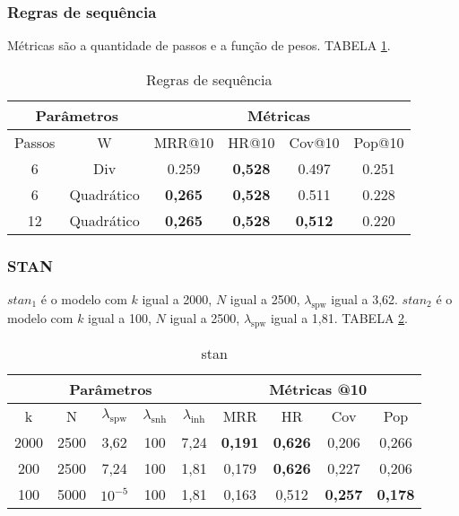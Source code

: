   \subsubsection{Regras de sequência}
Métricas são a quantidade de passos e a função de pesos. TABELA \ref{app:sr}.
\begin{table}[htbp]
    \centering
    \begin{tabular}{|c|c|c|c|c|c|}
        \hline
        \multicolumn{2}{|c|}{Parâmetros} & \multicolumn{4}{c|}{Métricas} \\
        \hline
        Passos & W & MRR@10 & HR@10 & Cov@10 & Pop@10 \\
        \hline
        6 & Div & 0.259 & \textbf{0,528} & 0.497 & 0.251 \\
        \hline
        6 & Quadrático & \textbf{0,265} & \textbf{0,528} & 0.511 & 0.228 \\
        \hline
        12 & Quadrático & \textbf{0,265} & \textbf{0,528} & \textbf{0,512} & 0.220 \\
        \hline
        \end{tabular}
    \caption{Regras de sequência}
    \label{app:sr}
\end{table}


\subsubsection{STAN}
$stan_1$ é o modelo com $k$ igual a 2000, $N$ igual a 2500,
$\lambda_{\text{spw}}$ igual a 3,62. $stan_2$ é o modelo com $k$ igual a 100,
$N$ igual a 2500, $\lambda_{\text{spw}}$ igual a 1,81. TABELA \ref{app:stan}.


\begin{table}[htbp]
    \centering
    \begin{tabular}{|c|c|c|c|c|c|c|c|c|}
      \hline
      \multicolumn{5}{|c|}{Parâmetros} & \multicolumn{4}{c|}{Métricas @10} \\
      \hline
      k & N & $\lambda_{\text{spw}}$ & $\lambda_{\text{snh}}$ & $\lambda_{\text{inh}}$ & MRR & HR & Cov & Pop \\
      \hline
      2000 & 2500 & 3,62 & 100 & 7,24 & \textbf{0,191} & \textbf{0,626} & 0,206 & 0,266 \\
      \hline
      200 & 2500 & 7,24 & 100 & 1,81& 0,179 & \textbf{0,626} & 0,227 & 0,206 \\
      \hline
      100 & 5000 & $10^{-5}$ & 100 & 1,81 & 0,163 & 0,512 & \textbf{0,257} & \textbf{0,178} \\
      \hline

    \end{tabular}
    \caption{stan}
    \label{app:stan}
  \end{table}



